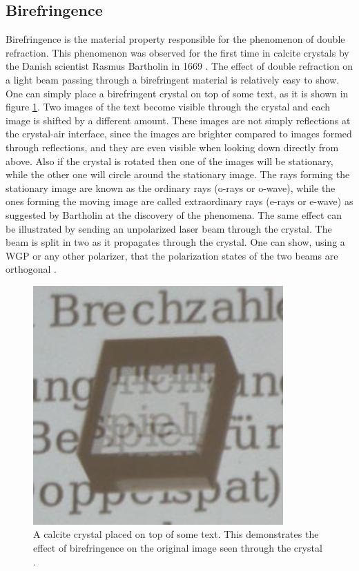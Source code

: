 \subsection{Birefringence}
\label{sec:birefringence}
Birefringence is the material property responsible for the phenomenon of double refraction. This phenomenon was observed for the first time in calcite crystals by the Danish scientist Rasmus Bartholin in 1669 \cite{RasmusBartholin1669ExperimentaDetegitur, Restaino2015PolarizationDevices}. The effect of double refraction on a light beam passing through a birefringent material is relatively easy to show. One can simply place a birefringent crystal on top of some text, as it is shown in figure \ref{fig:3birefringence}. Two images of the text become visible through the crystal and each image is shifted by a different amount. These images are not simply reflections at the crystal-air interface, since the images are brighter compared to images formed through reflections, and they are even visible when looking down directly from above. Also if the crystal is rotated then one of the images will be stationary, while the other one will circle around the stationary image. The rays forming the stationary image are known as the ordinary rays (o-rays or o-wave), while the ones forming the moving image are called extraordinary rays (e-rays or e-wave) as suggested by Bartholin at the discovery of the phenomena. The same effect can be illustrated by sending an unpolarized laser beam through the crystal. The beam is split in two as it propagates through the crystal. One can show, using a WGP or any other polarizer, that the polarization states of the two beams are orthogonal \cite{Roth2019Optik}.

\begin{figure}[h]
    \centering
    \includegraphics[scale=0.25]{images/3_chapter03/birefringence.png}
    \caption{A calcite crystal placed on top of some text. This demonstrates the effect of birefringence on the original image seen through the crystal \cite{Roth2019Optik}.}
    \label{fig:3birefringence}
\end{figure}

